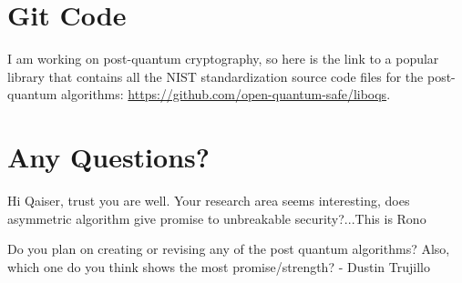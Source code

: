 \section{Git Code}
I am working on post-quantum cryptography, so here is the link to a popular library that contains all the NIST standardization source code files for the post-quantum algorithms:
\href{https://github.com/open-quantum-safe/liboqs}{https://github.com/open-quantum-safe/liboqs}.

\section{Any Questions?}


Hi Qaiser, trust you are well.
Your research area seems interesting, does asymmetric algorithm give promise to unbreakable security?...This is Rono
%

Do you plan on creating or revising any of the post quantum algorithms? Also, which one do you think shows the most promise/strength? - Dustin Trujillo 

%
%
